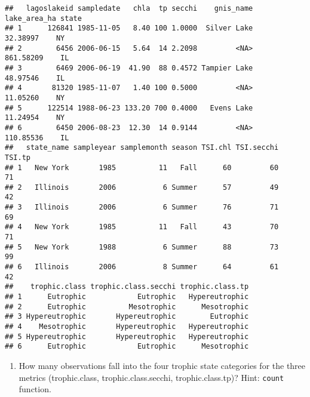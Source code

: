 \documentclass[]{article}
\providecommand{\tightlist}{%
  \setlength{\itemsep}{0pt}\setlength{\parskip}{0pt}}
\begin{document}
\begin{verbatim}
##   lagoslakeid sampledate   chla  tp secchi    gnis_name lake_area_ha state
## 1      126841 1985-11-05   8.40 100 1.0000  Silver Lake     32.38997    NY
## 2        6456 2006-06-15   5.64  14 2.2098         <NA>    861.58209    IL
## 3        6469 2006-06-19  41.90  88 0.4572 Tampier Lake     48.97546    IL
## 4       81320 1985-11-07   1.40 100 0.5000         <NA>     11.05260    NY
## 5      122514 1988-06-23 133.20 700 0.4000   Evens Lake     11.24954    NY
## 6        6450 2006-08-23  12.30  14 0.9144         <NA>    110.85536    IL
##   state_name sampleyear samplemonth season TSI.chl TSI.secchi TSI.tp
## 1   New York       1985          11   Fall      60         60     71
## 2   Illinois       2006           6 Summer      57         49     42
## 3   Illinois       2006           6 Summer      76         71     69
## 4   New York       1985          11   Fall      43         70     71
## 5   New York       1988           6 Summer      88         73     99
## 6   Illinois       2006           8 Summer      64         61     42
##    trophic.class trophic.class.secchi trophic.class.tp
## 1      Eutrophic            Eutrophic   Hypereutrophic
## 2      Eutrophic          Mesotrophic      Mesotrophic
## 3 Hypereutrophic       Hypereutrophic        Eutrophic
## 4    Mesotrophic       Hypereutrophic   Hypereutrophic
## 5 Hypereutrophic       Hypereutrophic   Hypereutrophic
## 6      Eutrophic            Eutrophic      Mesotrophic
\end{verbatim}

\begin{enumerate}
\def\labelenumi{\arabic{enumi}.}
\setcounter{enumi}{5}
\tightlist
\item
  How many observations fall into the four trophic state categories for
  the three metrics (trophic.class, trophic.class.secchi,
  trophic.class.tp)? Hint: \texttt{count} function.
\end{enumerate}
\end{document}

